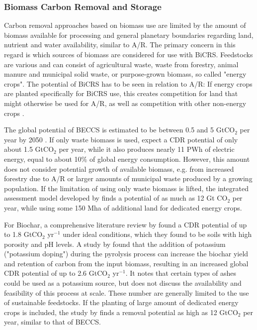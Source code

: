 \subsubsection{Biomass Carbon Removal and Storage}
Carbon removal approaches based on biomass use are limited by the amount of biomass available for processing and general planetary boundaries regarding land, nutrient and water availability, similar to A/R. The primary concern in this regard is which sources of biomass are considered for use with BiCRS. Feedstocks are various and can consist of agricultural waste, waste from forestry, animal manure and municipal solid waste, or purpose-grown biomass, so called "energy crops". The potential of BiCRS has to be seen in relation to A/R: If energy crops are planted specifically for BiCRS use, this creates competition for land that might otherwise be used for A/R, as well as competition with other non-energy crops \parencite{zhao_trade-offs_2024}.\vspace{2mm}

The global potential of BECCS is estimated to be between 0.5 and 5 GtCO$_2$ per year by 2050 \parencite{fuss_negative_2018}. If only waste biomass is used, \textcite{feng_global_2024} expect a CDR potential of only about 1.5 GtCO$_2$ per year, while it also produces nearly 11 PWh of electric energy, equal to about 10\% of global energy consumption. However, this amount does not consider potential growth of available biomass, e.g. from increased forestry due to A/R or larger amounts of municipal waste produced by a growing population. If the limitation of using only waste biomass is lifted, the integrated assessment model developed by \textcite{chiquier_integrated_2025} finds a potential of as much as 12 Gt CO$_2$ per year, while using some 150 Mha of additional land for dedicated energy crops.\vspace{2mm}

For Biochar, a comprehensive literature review by \textcite{biswal_use_2025} found a CDR potential of up to 1.8 GtCO$_2$ yr$^{-1}$ under ideal conditions, which they found to be soils with high porosity and pH levels. A study by \textcite{masek_potassium_2019} found that the addition of potassium ("potassium doping") during the pyrolysis process can increase the biochar yield and retention of carbon from the input biomass, resulting in an increased global CDR potential of up to 2.6 GtCO$_2$ yr$^{-1}$. It notes that certain types of ashes could be used as a potassium source, but does not discuss the availability and feasibility of this process at scale. These number are generally limited to the use of sustainable feedstocks. If the planting of large amount of dedicated energy crops is included, the study by \textcite{chiquier_integrated_2025} finds a removal potential as high as 12 GtCO$_2$ per year, similar to that of BECCS.

